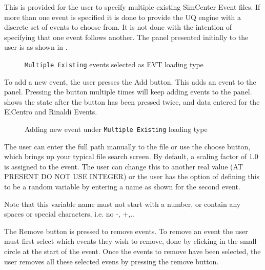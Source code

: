 This is provided for the user to specify multiple existing SimCenter
Event files.  If more than one event is specified it is done to provide
the UQ engine with a discrete set of events to choose from.  It is not
done with the intention of specifying that one event follows another.
The panel presented initially to the user is as shown
in .

\begin{figure}[!htbp]
  \caption{\texttt{Multiple Existing} events selected as EVT loading type}
  \label{fig:figure4}
\end{figure}

To add a new event, the user presses the Add button.  This adds an event to the panel.  Pressing the button multiple times will keep adding events to the panel.   shows the state after the button has been pressed twice, and data entered for the ElCentro and Rinaldi Events.

\begin{figure}[!htbp]
  \caption{Adding new event under \texttt{Multiple Existing} loading type}
  \label{fig:figure5}
\end{figure}

The user can enter the full path manually to the file or use the
choose button, which brings up your typical file search screen.  By
default, a scaling factor of 1.0 is assigned to the event.  The user
can change this to another real value (AT PRESENT DO NOT USE INTEGER)
or the user has the option of defining this to be a random variable by
entering a name as shown for the second event.

Note that this variable name must not start with a number, or contain
any spaces or special characters, i.e. no -, +,..

The Remove button is pressed to remove events. To remove an event the
user must first select which events they wish to remove, done by
clicking in the small circle at the start of the event. Once the
events to remove have been selected, the user removes all these
selected evens by pressing the remove button.

